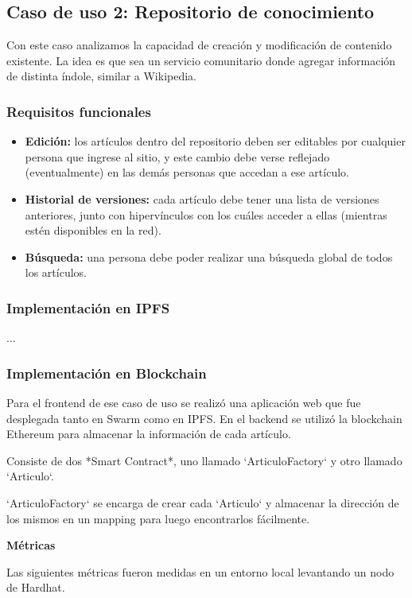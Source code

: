 \subsection{Caso de uso 2: Repositorio de conocimiento}

Con este caso analizamos la capacidad de creación y modificación de contenido existente. La idea es que sea un servicio comunitario donde agregar información de distinta índole, similar a Wikipedia.

\subsubsection{Requisitos funcionales}

\begin{itemize}
    \item \textbf{Edición:} los artículos dentro del repositorio deben ser editables por cualquier persona que ingrese al sitio, y este cambio debe verse reflejado (eventualmente) en las demás personas que accedan a ese artículo.
    \item \textbf{Historial de versiones:} cada artículo debe tener una lista de versiones anteriores, junto con hipervínculos con los cuáles acceder a ellas (mientras estén disponibles en la red).
    \item \textbf{Búsqueda:} una persona debe poder realizar una búsqueda global de todos los artículos.
\end{itemize}

\subsubsection{Implementación en IPFS}

...

\subsubsection{Implementación en Blockchain}

Para el frontend de ese caso de uso se realizó una aplicación web que fue desplegada tanto en Swarm como en IPFS. En el backend se utilizó la blockchain Ethereum para almacenar la información de cada artículo.

Consiste de dos *Smart Contract*, uno llamado `ArticuloFactory` y otro llamado `Articulo`.

`ArticuloFactory` se encarga de crear cada `Articulo` y almacenar la dirección de los mismos en un mapping para luego encontrarlos fácilmente.

\textbf{Métricas}

Las siguientes métricas fueron medidas en un entorno local levantando un nodo de Hardhat.